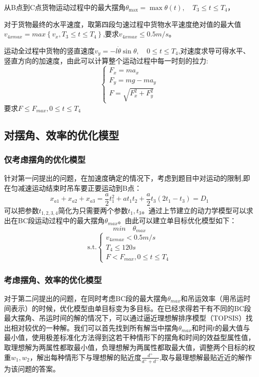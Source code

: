\documentclass[withoutpreface,bwprint]{cumcmthesis} %
\begin{document}
从B点到C点货物运动过程中的最大摆角$\theta_{\max }=\max \theta(t), \quad T_3 \leqslant t \leqslant T_{4}$，

对于货物最终的水平速度，取第四段匀速过程中货物水平速度绝对值的最大值$v_{4xmax}=max\left \{v_{x},T_3 \leq t \leq T_4\right \}$,要求$v_{4xmax} \leq 0.5m/s$。

运动全过程中货物的竖直速度$v_{y}=-l\dot{\theta}\sin\theta,\quad 0\leq t\leq T_4$,对速度求导可得水平、竖直方向的加速度，由此可以计算整个运动过程中每一时刻的拉力:$$\left\{\begin{array}{l}
        F_{x}=m a_{x}   \\
        F_{y}=mg-ma_{y} \\
        F=\sqrt{F_{x}^2 + F_{y}^2}
    \end{array}\right.$$
要求$F \leq F_{max},0 \leq t \leq T_4$

\subsection{对摆角、效率的优化模型}
\subsubsection{仅考虑摆角的优化模型}
针对第一问提出的问题，在加速度确定的情况下，考虑到题目中对运动的限制,即在匀减速运动结束时吊车要正要运动到B点：$$x_{a1}+x_{a2}+x_{a3}=\frac{a}{2}t_1^2+at_1t_2+\frac{a}{2}t_3(2t_1-t_3)=D_1$$可以把参数$t_{1,2,3,4}$简化为只需要两个参数$t_1,t_3$。通过上节建立的动力学模型可以求出在BC段运动过程中的最大摆角$\theta_{max}$。由此可以建立单目标优化模型如下：
$$min\quad \theta_{max}$$
$$\text{s.t.}\left \{\begin{array}{l}
    v_{4xmax}<0.5m/s \\
    T_4\leq120s \\
    F<F_{max},0\leq t\leq T_4
\end{array}\right.$$

\subsubsection{考虑摆角、效率的优化模型}
对于第二问提出的问题，在同时考虑BC段的最大摆角$\theta_{max}$和吊运效率（用吊运时间表示）的时候，优化模型由单目标变为多目标。在已经求得若干有不同的BC段最大摆角、吊运时间的解的情况下，可以通过逼近理想解排序模型（TOPSIS）找出相对较优的一种解。我们可以首先找到所有解当中摆角$\theta_{max}$和时间$t$的最大值与最小值，使用极差标准化方法得到这若干种情形下的摆角和时间的效益型属性值，取理想解为两属性都取最小值，负理想解为两属性都取最大值，调整两个目标的权重$w_1,w_2$，解出每种情形下与理想解的贴近度$\frac{d^+}{d^++d^-}$,取与最理想解最贴近近的解作为该问题的答案。
\end{document}
